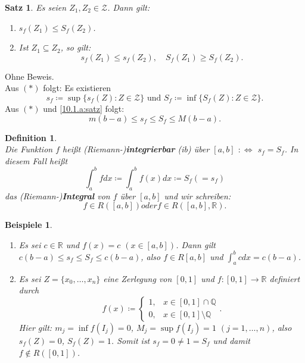 \documentclass[12pt]{extreport} %
\newcommand{\Q}{\mathbb{Q}}
\newcommand{\R}{\mathbb{R}}
\theoremstyle{named}
\theoremstyle{itshape}
\newtheorem{satz}[unnamedtheorem]{Satz}
\newtheorem*{definition}{Definition}
\theoremstyle{normal}
\newtheorem*{beispiele}{Beispiele}
\begin{document}
{\begin{satz} \label{10.1:satz}
Es seien $Z_{1}, Z_{2} \in \mathcal{Z}$. Dann gilt:
	\begin{enumerate}
		\item $s_{f}(Z_{1}) \leq S_{f}(Z_{2})$. \label{10.1.a:satz}
		\item Ist $Z_{1} \subseteq Z_{2}$, so gilt: 
		      $$s_{f}(Z_{1}) \leq s_{f}(Z_{2}), \quad S_{f}(Z_{1}) \geq S_{f}(Z_{2}). $$ \label{10.1.b:satz}
	\end{enumerate}	      
\end{satz}		      
Ohne Beweis. \\
Aus $(*)$ folgt: Es existieren
	$$ s_{f}  \coloneqq \sup \{ s_{f}(Z) \colon Z \in \mathcal{Z} \} \text{ und } S_{f}  \coloneqq \inf \{ S_{f}(Z) \colon Z \in \mathcal{Z} \}.$$
Aus $(*)$ und \ref{10.1.a:satz} folgt:
	$$ m (b - a) \leq s_{f} \leq  S_{f} \leq M (b - a). $$


   
\begin{definition} ~\\
	Die Funktion $f$ hei{\ss}t (Riemann-)\textbf{integrierbar} (ib) über $[a, b]$ $:\iff$ $s_{f} = S_{f}$. In diesem Fall hei{\ss}t
		$$ \int_{a}^{b} f dx \coloneqq \int_{a}^{b} f(x) dx \coloneqq S_{f} (= s_{f}) $$
	das (Riemann-)\textbf{Integral}	von $f$ über $[a, b]$ und wir schreiben: \\
		$$f \in R([a, b]) oder f \in R([a, b],\R).$$
\end{definition}


\begin{beispiele} ~\
	\begin{enumerate}
		\item Es sei $c \in \R$ und $f(x) = c$ $(x \in [a, b])$. Dann gilt $c(b - a) \leq s_{f} \leq S_{f} \leq c(b- a)$, also $f \in R[a, b]$ und 
		$\int_{a}^{b}c dx = c(b - a)$.
		\item Es sei $Z = \{ x_{0}, \dotsc, x_{n} \}$ eine Zerlegung von $[0, 1]$ und $f:[0,1] \to \R$ definiert durch
			$$ f(x) \coloneqq \begin{cases} 1, & x \in [0, 1] \cap \Q \\ 0, & x \in [0, 1] \setminus \Q \end{cases}. $$  
			Hier gilt: $m_{j} = \inf f(I_{j}) = 0$, $ M_{j} = \sup f(I_{j}) = 1$ $(j=1,\dots,n)$, also $s_{f}(Z) = 0$, $S_{f}(Z) = 1$.
			Somit ist $s_{f} = 0 \neq 1 = S_{f}$ und damit $f \notin R([0, 1])$.
	\end{enumerate}	
\end{beispiele}

}
\end{document}

